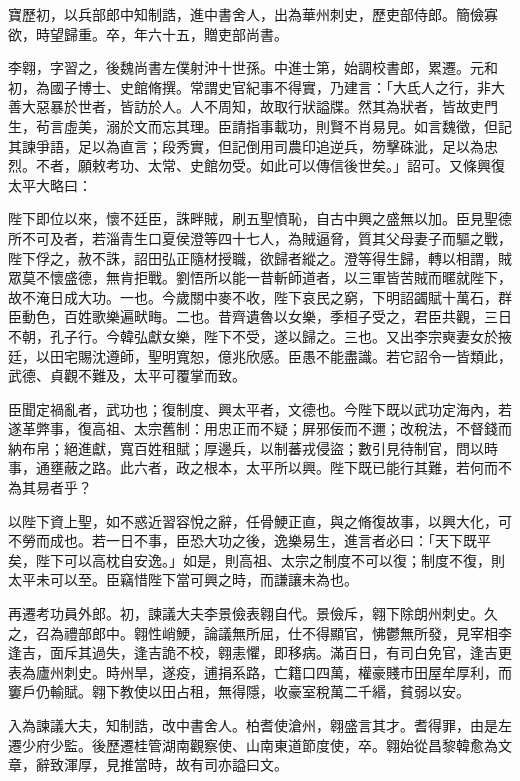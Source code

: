\begin{pinyinscope}
 寶歷初，以兵部郎中知制誥，進中書舍人，出為華州刺史，歷吏部侍郎。簡儉寡欲，時望歸重。卒，年六十五，贈吏部尚書。



 李翱，字習之，後魏尚書左僕射沖十世孫。中進士第，始調校書郎，累遷。元和初，為國子博士、史館脩撰。常謂史官紀事不得實，乃建言：「大氐人之行，非大善大惡暴於世者，皆訪於人。人不周知，故取行狀謚牒。然其為狀者，皆故吏門生，茍言虛美，溺於文而忘其理。臣請指事載功，則賢不肖易見。如言魏徵，但記其諫爭語，足以為直言；段秀實，但記倒用司農印追逆兵，笏擊硃泚，足以為忠烈。不者，願敕考功、太常、史館勿受。如此可以傳信後世矣。」詔可。又條興復太平大略曰：



 陛下即位以來，懷不廷臣，誅畔賊，刷五聖憤恥，自古中興之盛無以加。臣見聖德所不可及者，若淄青生口夏侯澄等四十七人，為賊逼脅，質其父母妻子而驅之戰，陛下俘之，赦不誅，詔田弘正隨材授職，欲歸者縱之。澄等得生歸，轉以相謂，賊眾莫不懷盛德，無肯拒戰。劉悟所以能一昔斬師道者，以三軍皆苦賊而暱就陛下，故不淹日成大功。一也。今歲關中麥不收，陛下哀民之窮，下明詔蠲賦十萬石，群臣動色，百姓歌樂遍畎畮。二也。昔齊遺魯以女樂，季桓子受之，君臣共觀，三日不朝，孔子行。今韓弘獻女樂，陛下不受，遂以歸之。三也。又出李宗奭妻女於掖廷，以田宅賜沈遵師，聖明寬恕，億兆欣感。臣愚不能盡識。若它詔令一皆類此，武德、貞觀不難及，太平可覆掌而致。



 臣聞定禍亂者，武功也；復制度、興太平者，文德也。今陛下既以武功定海內，若遂革弊事，復高祖、太宗舊制：用忠正而不疑；屏邪佞而不邇；改稅法，不督錢而納布帛；絕進獻，寬百姓租賦；厚邊兵，以制蕃戎侵盜；數引見待制官，問以時事，通壅蔽之路。此六者，政之根本，太平所以興。陛下既已能行其難，若何而不為其易者乎？



 以陛下資上聖，如不惑近習容悅之辭，任骨鯁正直，與之脩復故事，以興大化，可不勞而成也。若一日不事，臣恐大功之後，逸樂易生，進言者必曰：「天下既平矣，陛下可以高枕自安逸。」如是，則高祖、太宗之制度不可以復；制度不復，則太平未可以至。臣竊惜陛下當可興之時，而謙讓未為也。



 再遷考功員外郎。初，諫議大夫李景儉表翱自代。景儉斥，翱下除朗州刺史。久之，召為禮部郎中。翱性峭鯁，論議無所屈，仕不得顯官，怫鬱無所發，見宰相李逢吉，面斥其過失，逢吉詭不校，翱恚懼，即移病。滿百日，有司白免官，逢吉更表為廬州刺史。時州旱，遂疫，逋捐系路，亡籍口四萬，權豪賤市田屋牟厚利，而窶戶仍輸賦。翱下教使以田占租，無得隱，收豪室稅萬二千緡，貧弱以安。



 入為諫議大夫，知制誥，改中書舍人。柏耆使滄州，翱盛言其才。耆得罪，由是左遷少府少監。後歷遷桂管湖南觀察使、山南東道節度使，卒。翱始從昌黎韓愈為文章，辭致渾厚，見推當時，故有司亦謚曰文。




\end{pinyinscope}
